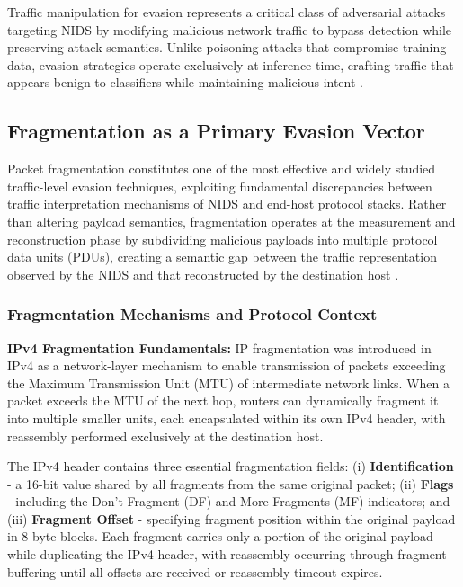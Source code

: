 Traffic manipulation for evasion represents a critical class of adversarial attacks targeting NIDS by modifying malicious network traffic to bypass detection while preserving attack semantics. Unlike poisoning attacks that compromise training data, evasion strategies operate exclusively at inference time, crafting traffic that appears benign to classifiers while maintaining malicious intent \cite{huang2011adversarial, hashemi2020enhancing}.

\subsection{Fragmentation as a Primary Evasion Vector}

Packet fragmentation constitutes one of the most effective and widely studied traffic-level evasion techniques, exploiting fundamental discrepancies between traffic interpretation mechanisms of NIDS and end-host protocol stacks. Rather than altering payload semantics, fragmentation operates at the measurement and reconstruction phase by subdividing malicious payloads into multiple protocol data units (PDUs), creating a semantic gap between the traffic representation observed by the NIDS and that reconstructed by the destination host \cite{corona2013adversarial, vitorino2023sok}.

\subsubsection{Fragmentation Mechanisms and Protocol Context}

\textbf{IPv4 Fragmentation Fundamentals:}
IP fragmentation was introduced in IPv4 as a network-layer mechanism to enable transmission of packets exceeding the Maximum Transmission Unit (MTU) of intermediate network links. When a packet exceeds the MTU of the next hop, routers can dynamically fragment it into multiple smaller units, each encapsulated within its own IPv4 header, with reassembly performed exclusively at the destination host.

The IPv4 header contains three essential fragmentation fields: (i) \textbf{Identification} - a 16-bit value shared by all fragments from the same original packet; (ii) \textbf{Flags} - including the Don't Fragment (DF) and More Fragments (MF) indicators; and (iii) \textbf{Fragment Offset} - specifying fragment position within the original payload in 8-byte blocks. Each fragment carries only a portion of the original payload while duplicating the IPv4 header, with reassembly occurring through fragment buffering until all offsets are received or reassembly timeout expires.

